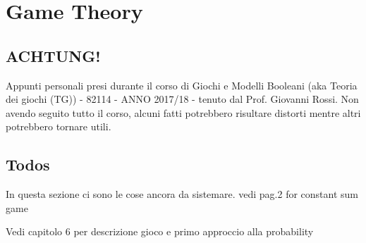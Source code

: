 \chapter{Game Theory}

\section{ACHTUNG!}

Appunti personali presi durante il corso di Giochi e Modelli Booleani (aka Teoria dei giochi (TG)) - 82114 - ANNO 2017/18 - tenuto dal Prof. Giovanni Rossi. Non avendo seguito tutto il corso, alcuni fatti potrebbero risultare distorti mentre altri potrebbero tornare utili.

\section{Todos}
In questa sezione ci sono le cose ancora da sistemare.
vedi \cite{vorobev01} pag.2 for constant sum game

Vedi capitolo 6 per descrizione gioco e primo approccio alla probability



%





%
%
%
%



%
%
%
%
%
%








